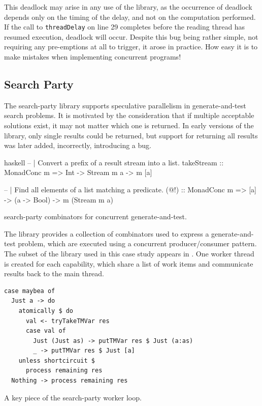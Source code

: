 This deadlock may arise in any use of the library, as the occurrence
of deadlock depends only on the timing of the delay, and not on the
computation performed.  If the call to \verb|threadDelay| on line 29
completes before the reading thread has resumed execution, deadlock
will occur.  Despite this bug being rather simple, not requiring any
pre-emptions at all to trigger, it arose in practice.  How easy it is
to make mistakes when implementing concurrent programs!

\subsection{Search Party}

The search-party\cite{search_party} library supports speculative
parallelism in generate-and-test search problems.  It is motivated by
the consideration that if multiple acceptable solutions exist, it may
not matter which one is returned.  In early versions of the library,
only single results could be returned, but support for returning all
results was later added, incorrectly, introducing a bug.

\begin{listing}
\centering
\begin{cminted}{haskell}
-- | Convert a prefix of a result stream into a list.
takeStream :: MonadConc m => Int -> Stream m a -> m [a]

-- | Find all elements of a list matching a predicate.
(@!) :: MonadConc m => [a] -> (a -> Bool) -> m (Stream m a)
\end{cminted}
\caption{search-party combinators for concurrent generate-and-test.}\label{lst:example-searchparty0}
\end{listing}

The library provides a collection of combinators used to express a
generate-and-test problem, which are executed using a concurrent
producer/consumer pattern.  The subset of the library used in this
case study appears in .  One worker
thread is created for each capability, which share a list of work
items and communicate results back to the main thread.

\begin{listing}
\centering
\begin{minipage}{0.5\textwidth}
\begin{verbatim}
case maybea of
  Just a -> do
    atomically $ do
      val <- tryTakeTMVar res
      case val of
        Just (Just as) -> putTMVar res $ Just (a:as)
        _ -> putTMVar res $ Just [a]
    unless shortcircuit $
      process remaining res
  Nothing -> process remaining res
\end{verbatim}
\end{minipage}
\caption{A key piece of the search-party worker loop.}\label{lst:example-searchparty1}
\end{listing}

